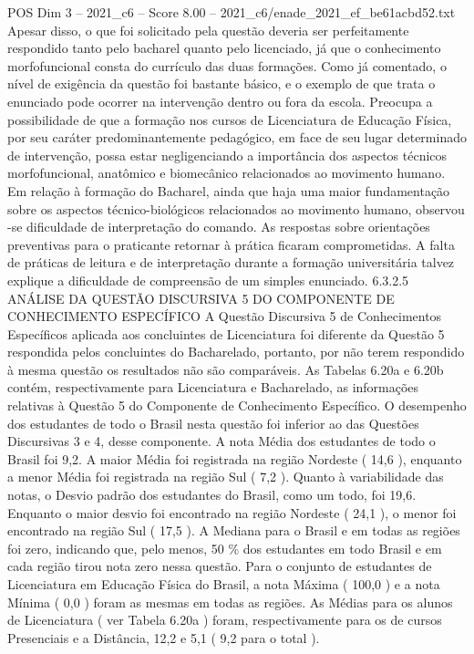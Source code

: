 \begin{textsample}{POS Dim 3 – 2021\_c6 – Score 8.00 – 2021\_c6/enade\_2021\_ef\_be61acbd52.txt}
Apesar disso, o que foi solicitado pela questão deveria ser perfeitamente respondido tanto pelo bacharel quanto pelo licenciado, já que o conhecimento morfofuncional consta do currículo das duas formações.
Como já comentado, o nível de exigência da questão foi bastante básico, e o exemplo de que trata o enunciado pode ocorrer na intervenção dentro ou fora da escola.
Preocupa a possibilidade de que a formação nos cursos de Licenciatura de Educação Física, por seu caráter predominantemente pedagógico, em face de seu lugar determinado de intervenção, possa estar negligenciando a importância dos aspectos técnicos morfofuncional, anatômico e biomecânico relacionados ao movimento humano.
Em relação à formação do Bacharel, ainda que haja uma maior fundamentação sobre os aspectos técnico-biológicos relacionados ao movimento humano, observou -se dificuldade de interpretação do comando.
As respostas sobre orientações preventivas para o praticante retornar à prática ficaram comprometidas.
A falta de práticas de leitura e de interpretação durante a formação universitária talvez explique a dificuldade de compreensão de um simples enunciado. 6.3.2.5 ANÁLISE DA QUESTÃO DISCURSIVA 5 DO COMPONENTE DE CONHECIMENTO ESPECÍFICO A Questão Discursiva 5 de Conhecimentos Específicos aplicada aos concluintes de Licenciatura foi diferente da Questão 5 respondida pelos concluintes do Bacharelado, portanto, por não terem respondido à mesma questão os resultados não são comparáveis.
As Tabelas 6.20a e 6.20b contém, respectivamente para Licenciatura e Bacharelado, as informações relativas à Questão 5 do Componente de Conhecimento Específico.
O desempenho dos estudantes de todo o Brasil nesta questão foi inferior ao das Questões Discursivas 3 e 4, desse componente.
A nota Média dos estudantes de todo o Brasil foi 9,2.
A maior Média foi registrada na região Nordeste ( 14,6 ), enquanto a menor Média foi registrada na região Sul ( 7,2 ).
Quanto à variabilidade das notas, o Desvio padrão dos estudantes do Brasil, como um todo, foi 19,6.
Enquanto o maior desvio foi encontrado na região Nordeste ( 24,1 ), o menor foi encontrado na região Sul ( 17,5 ).
A Mediana para o Brasil e em todas as regiões foi zero, indicando que, pelo menos, 50 \% dos estudantes em todo Brasil e em cada região tirou nota zero nessa questão.
Para o conjunto de estudantes de Licenciatura em Educação Física do Brasil, a nota Máxima ( 100,0 ) e a nota Mínima ( 0,0 ) foram as mesmas em todas as regiões.
As Médias para os alunos de Licenciatura ( ver Tabela 6.20a ) foram, respectivamente para os de cursos Presenciais e a Distância, 12,2 e 5,1 ( 9,2 para o total ).

\end{textsample}
